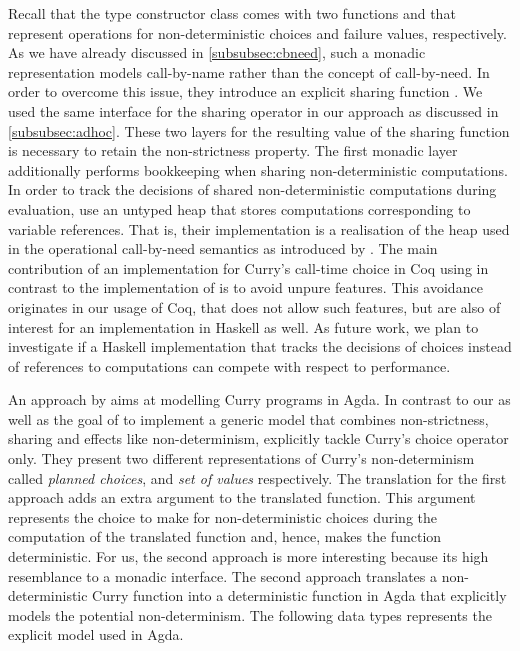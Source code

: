 Recall that the type constructor class  comes with two functions  and  that represent operations for non\--deterministic choices and failure values, respectively.
As we have already discussed in \autoref{subsubsec:cbneed}, such a monadic representation models call\--by\--name rather than the concept of call\--by\--need.
In order to overcome this issue, they introduce an explicit sharing function .
We used the same interface for the sharing operator in our approach as discussed in \autoref{subsubsec:adhoc}.
These two layers for the resulting value of the sharing function is necessary to retain the non\--strictness property.
The first monadic layer additionally performs bookkeeping when sharing non\--deterministic computations.
In order to track the decisions of shared non\--deterministic computations during evaluation, \citeauthor{fischer2009purely} use an untyped heap that stores computations corresponding to variable references.
That is, their implementation is a realisation of the heap used in the operational call\--by\--need semantics as introduced by \citet{launchbury1993natural}.
The main contribution of an implementation for Curry's call\--time choice in Coq using  in contrast to the implementation of \citeauthor{fischer2009purely} is to avoid unpure features.
This avoidance originates in our usage of Coq, that does not allow such features, but are also of interest for an implementation in Haskell as well.
As future work, we plan to investigate if a Haskell implementation that tracks the decisions of choices instead of references to computations can compete with respect to performance.

An approach by \citet{antoy2017proving} aims at modelling Curry programs in Agda.
In contrast to our as well as the goal of \citeauthor{fischer2009purely} to implement a generic model that combines non\--strictness, sharing and effects like non\--determinism, \citeauthor{antoy2017proving} explicitly tackle Curry's choice operator only.
They present two different representations of Curry's non\--determinism called \emph{planned choices}, and \emph{set of values} respectively.
The translation for the first approach adds an extra argument to the translated function.
This argument represents the choice to make for non\--deterministic choices during the computation of the translated function and, hence, makes the function deterministic.
For us, the second approach is more interesting because its high resemblance to a monadic interface.
The second approach translates a non\--deterministic Curry function into a deterministic function in Agda that explicitly models the potential non\--determinism.
The following data types represents the explicit model used in Agda.

